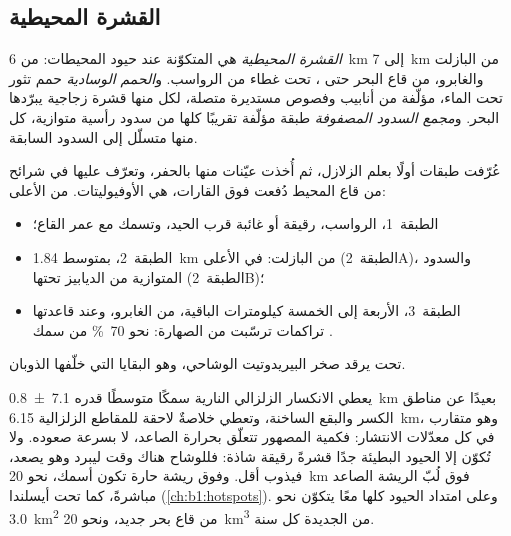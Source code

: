\subsection*{القشرة المحيطية}

\begin{definition}\label{def:b1:rifts-ridges-margins:oceanic-crust}
\emph{القشرة المحيطية} هي  المتكوّنة عند حيود المحيطات: من \qty{6}{km} إلى \qty{7}{km} من البازلت والغابرو، من قاع البحر حتى ، تحت غطاء من الرواسب. و\emph{الحمم الوسادية} حمم تثور تحت الماء، مؤلّفة من أنابيب وفصوص مستديرة متصلة، لكل منها قشرة زجاجية يبرّدها البحر. و\emph{مجمع السدود المصفوفة} طبقة مؤلّفة تقريبًا كلها من سدود رأسية متوازية، كل منها متسلّل إلى السدود السابقة.
\end{definition}

عُرّفت طبقات  أولًا بعلم الزلازل، ثم أُخذت عيّنات منها بالحفر، وتعرّف عليها في شرائح من قاع المحيط دُفعت فوق القارات، هي الأوفيوليتات. من الأعلى:
\begin{itemize}
  \item الطبقة~1، الرواسب، رقيقة أو غائبة قرب الحيد، وتسمك مع عمر القاع؛
  \item الطبقة~2، بمتوسط \qty{1.84}{km} من البازلت:  في الأعلى (الطبقة~2A)، والسدود المتوازية من الديابيز تحتها (الطبقة~2B)؛
  \item الطبقة~3، الأربعة إلى الخمسة كيلومترات الباقية، من الغابرو، وعند قاعدتها تراكمات ترسّبت من الصهارة: نحو \qty{70}{\percent} من سمك .
\end{itemize}
تحت  يرقد صخر البيريدوتيت الوشاحي، وهو البقايا التي خلّفها الذوبان.

يعطي الانكسار الزلزالي  النارية سمكًا متوسطًا قدره \qty[uncertainty-mode=separate]{7.1 \pm 0.8}{km} بعيدًا عن مناطق الكسر والبقع الساخنة، وتعطي خلاصةٌ لاحقة للمقاطع الزلزالية \qty{6.15}{km}، وهو متقارب في كل معدّلات الانتشار: فكمية المصهور تتعلّق بحرارة  الصاعد، لا بسرعة صعوده. ولا تُكوّن إلا الحيود البطيئة جدًا قشرةً رقيقة شاذة: فللوشاح هناك وقت ليبرد وهو يصعد، فيذوب أقل. وفوق ريشة حارة تكون  أسمك، نحو \qty{20}{km} فوق لُبّ الريشة الصاعد مباشرةً، كما تحت أيسلندا (\cref{ch:b1:hotspots}). وعلى امتداد الحيود كلها معًا يتكوّن نحو \qty{3.0}{km^2} من قاع بحر جديد، ونحو \qty{20}{km^3} من  الجديدة كل سنة.

